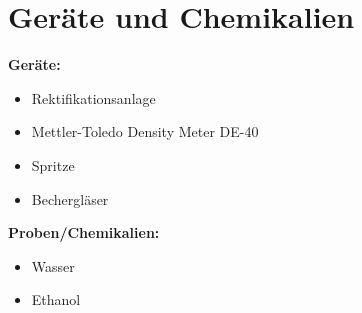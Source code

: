 \newpage
\section{Geräte und Chemikalien}
\label{sec:geraete}

\textbf{Geräte:}
\begin{itemize}
\item Rektifikationsanlage
\item Mettler-Toledo Density Meter DE-40
\item Spritze
\item Bechergläser
\end{itemize}

\vspace*{5mm}

\textbf{Proben/Chemikalien:}
\begin{itemize}
\item Wasser
\item Ethanol

\end{itemize}





